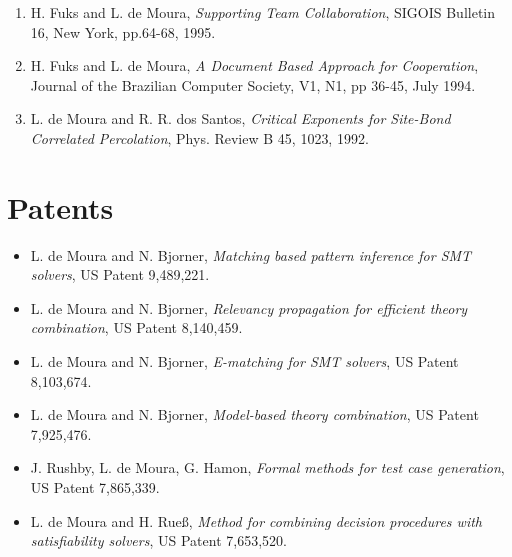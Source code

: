 \documentclass{article}
\begin{document}
\begin{enumerate}
\item H. Fuks and L. de Moura,
{\em Supporting Team Collaboration},
SIGOIS Bulletin 16, New York, pp.64-68, 1995.

\item H. Fuks and L. de Moura,
{\em A Document Based Approach for Cooperation},
Journal of the Brazilian Computer Society, V1, N1, pp 36-45, July 1994.

\item L. de Moura and R. R. dos Santos,
{\em Critical Exponents for Site-Bond Correlated Percolation},
Phys. Review B 45, 1023, 1992.
\end{enumerate}

\section*{Patents}
\begin{itemize}
\item L. de Moura and N. Bjorner, \emph{Matching based pattern inference for SMT solvers}, US Patent 9,489,221.
\item L. de Moura and N. Bjorner, \emph{Relevancy propagation for efficient theory combination}, US Patent 8,140,459.
\item L. de Moura and N. Bjorner, \emph{E-matching for SMT solvers}, US Patent 8,103,674.
\item L. de Moura and N. Bjorner, \emph{Model-based theory combination}, US Patent 7,925,476.
\item J. Rushby, L. de Moura, G. Hamon, \emph{Formal methods for test case generation}, US Patent 7,865,339.
\item L. de Moura and H. Rue\ss, \emph{Method for combining decision procedures with satisfiability solvers}, US Patent 7,653,520.
\end{itemize}
\end{document}
